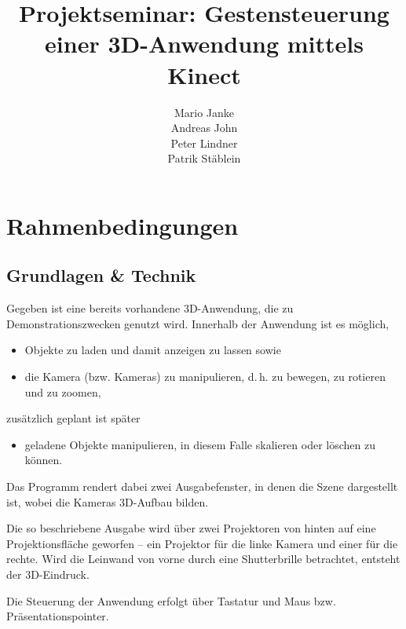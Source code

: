 \documentclass[11pt,a4paper]{scrartcl}
\title{Projektseminar: Gestensteuerung einer 3D-Anwendung mittels Kinect}
\author{
	Mario Janke\\
	Andreas John\\
	Peter Lindner\\
	Patrik Stäblein}
\date{}
\begin{document}
\maketitle
\tableofcontents
\clearpage
\section{Rahmenbedingungen}
	\subsection{Grundlagen \& Technik}
	Gegeben ist eine bereits vorhandene 3D-Anwendung, die zu Demonstrationszwecken genutzt wird. Innerhalb der Anwendung ist es möglich,
	\begin{itemize}
		\item Objekte zu laden und damit anzeigen zu lassen sowie
		\item die Kamera (bzw. Kameras) zu manipulieren, d.\,h. zu bewegen, zu rotieren und zu zoomen,
	\end{itemize}
zusätzlich geplant ist später
	\begin{itemize}
		\item geladene Objekte manipulieren, in diesem Falle skalieren oder löschen zu können.
	\end{itemize}
	Das Programm rendert dabei zwei Ausgabefenster, in denen die Szene dargestellt ist, wobei die Kameras 3D-Aufbau bilden.\par
	Die so beschriebene Ausgabe wird über zwei Projektoren von hinten auf eine Projektionsfläche geworfen -- ein Projektor für die linke Kamera und einer für die rechte. Wird die \glqq Leinwand\grqq{} von vorne durch eine Shutterbrille betrachtet, entsteht der 3D-Eindruck.\par 
	Die Steuerung der Anwendung erfolgt über Tastatur und Maus bzw. Präsentationspointer.
\end{document}
